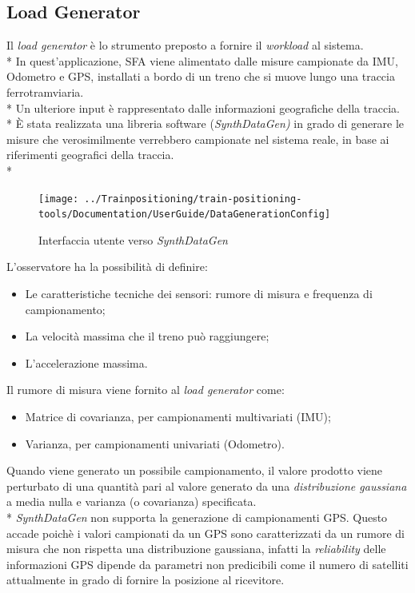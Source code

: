 \subsection{Load Generator}
Il \emph{load generator} \`e lo strumento preposto a fornire il \emph{workload} al sistema.\\*
In quest'applicazione, SFA viene alimentato dalle misure campionate da IMU, Odometro e GPS, installati a bordo di un treno che si muove lungo una traccia ferrotramviaria.\\*
Un ulteriore input \`e rappresentato dalle informazioni geografiche della traccia.\\*
\`E stata realizzata una libreria software (\emph{SynthDataGen)} in grado di generare le misure che verosimilmente verrebbero campionate nel sistema reale, in base ai riferimenti geografici della traccia.\\*
\begin{figure}[h]
	\centering
	\texttt{[image: ../Trainpositioning/train-positioning-tools/Documentation/UserGuide/DataGenerationConfig]}
	\caption{Interfaccia utente verso \emph{SynthDataGen}}
	\label{fig:datagenerationconfig}
\end{figure}
\FloatBarrier
L'osservatore ha la possibilit\`a di definire:
\begin{itemize}
	\item Le caratteristiche tecniche dei sensori: rumore di misura \cite{measnoise} e frequenza di campionamento;
	\item La velocit\`a massima che il treno pu\`o raggiungere;
	\item L'accelerazione massima.
\end{itemize}
Il rumore di misura viene fornito al \emph{load generator} come:
\begin{itemize}
	\item Matrice di covarianza, per campionamenti multivariati (IMU);
	\item Varianza, per campionamenti univariati (Odometro).
\end{itemize}
Quando viene generato un possibile campionamento, il valore prodotto viene perturbato di una quantit\`a pari al valore generato da una \emph{distribuzione gaussiana} a media nulla e varianza (o covarianza) specificata.\\*
\emph{SynthDataGen} non supporta la generazione di campionamenti GPS. Questo accade poich\`e i valori campionati da un GPS sono caratterizzati da un rumore di misura che non rispetta una distribuzione gaussiana, infatti la \emph{reliability} delle informazioni GPS dipende da parametri non predicibili come il numero di satelliti attualmente in grado di fornire la posizione al ricevitore.  \cite{gpsdarkarea}
